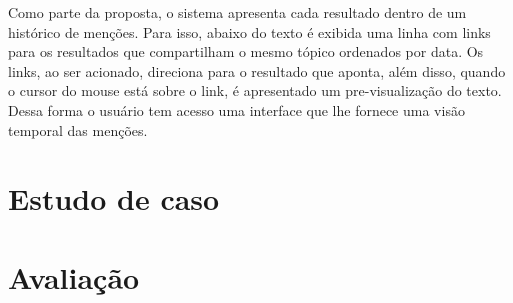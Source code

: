 Como parte da proposta, o sistema apresenta cada resultado dentro de um histórico de menções. Para isso, abaixo do texto é exibida uma linha com links para os resultados que compartilham o mesmo tópico ordenados por data. Os links, ao ser acionado, direciona para o resultado que aponta, além disso, quando o cursor do mouse está sobre o link, é apresentado um pre-visualização do texto. Dessa forma o usuário tem acesso uma interface que lhe fornece uma visão temporal das menções.





\section{Estudo de caso}


\section{Avaliação}

